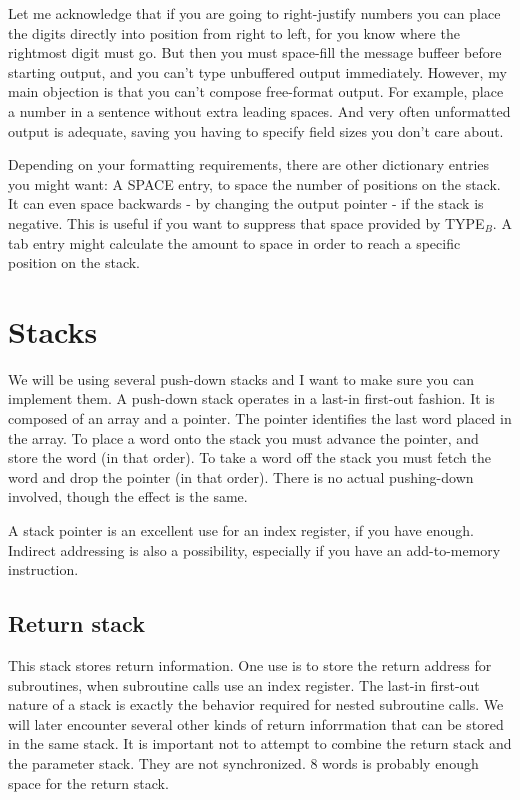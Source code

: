 \documentclass[b5paper, oneside]{book}
\begin{document}
Let me acknowledge that if you are going to right-justify numbers you can place the digits directly into position from right to left, for you know where the rightmost digit must go. But then you must space-fill the message buffeer before starting output, and you can't type unbuffered output immediately. However, my main objection is that you can't compose free-format output. For example, place a number in a sentence without extra leading spaces. And very often unformatted output is adequate, saving you having to specify field sizes you don't care about.

Depending on your formatting requirements, there are other dictionary entries you might want: A SPACE entry, to space the number of positions on the stack. It can even space backwards - by changing the output pointer - if the stack is negative. This is useful if you want to suppress that space provided by TYPE$_B$. A tab entry might calculate the amount to space in order to reach a specific position on the stack.

\section{Stacks}
We will be using several push-down stacks and I want to make sure you can implement them. A push-down stack operates in a last-in first-out fashion. It is composed of an array and a pointer. The pointer identifies the last word placed in the array. To place a word onto the stack you must advance the pointer, and store the word (in that order). To take a word off the stack you must fetch the word and drop the pointer (in that order). There is no actual pushing-down involved, though the effect is the same.

A stack pointer is an excellent use for an index register, if you have enough. Indirect addressing is also a possibility, especially if you have an add-to-memory instruction.

\subsection{Return stack}
This stack stores return information. One use is to store the return address for subroutines, when subroutine calls use an index register. The last-in first-out nature of a stack is exactly the behavior required for nested subroutine calls. We will later encounter several other kinds of return inforrmation that can be stored in the same stack. It is important not to attempt to combine the return stack and the parameter stack. They are not synchronized. 8 words is probably enough space for the return stack.
\end{document}
